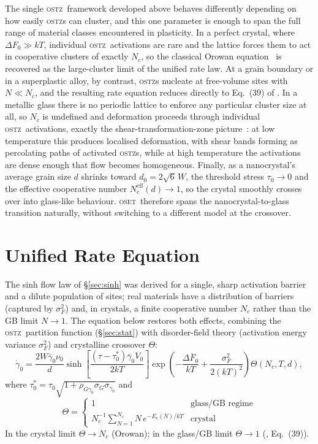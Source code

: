 \documentclass[3p]{elsarticle}
\newcommand{\OSTZ}{\textsc{ostz}}
\newcommand{\OSET}{\textsc{oset}}
\newcommand{\dF}{\Delta F_0}
\newcommand{\gz}{\gamma_0}
\begin{document}
The single \OSTZ\ framework developed above behaves differently
depending on how easily \OSTZ s can cluster, and this one parameter
is enough to span the full range of material classes encountered in
plasticity. In a perfect crystal, where $\dF\gg kT$, individual
\OSTZ\ activations are rare and the lattice forces them to act in
cooperative clusters of exactly $N_c$, so the classical Orowan
equation~\citep{orowan1940} is recovered as the large-cluster limit
of the unified rate law. At a grain boundary or in a superplastic alloy, by contrast,
\OSTZ s nucleate at free-volume sites with $N\ll N_c$, and the
resulting rate equation reduces directly to Eq.~(39) of
\citet{pad-part1}. In a metallic glass there is no
periodic lattice to enforce any particular cluster size at all, so
$N_c$ is undefined and deformation proceeds through individual
\OSTZ\ activations, exactly the shear-transformation-zone
picture~\citep{argon1979,falk-langer1998}: at low temperature this
produces localised deformation, with shear bands forming as
percolating paths of activated \OSTZ s, while at high temperature
the activations are dense enough that flow becomes homogeneous.
Finally, as a nanocrystal's average grain size $d$ shrinks toward
$d_0=2\sqrt6\,W$, the threshold stress $\tau_0\to0$ and the
effective cooperative number $N_c^\text{eff}(d)\to1$, so the
crystal smoothly crosses over into glass-like behaviour. \OSET\
therefore spans the nanocrystal-to-glass transition naturally,
without switching to a different model at the crossover.

\section{Unified Rate Equation}
\label{sec:unified}

The sinh flow law of \S\ref{sec:sinh} was derived for a single,
sharp activation barrier and a dilute population of sites; real
materials have a distribution of barriers (captured by $\sigma_F^2$)
and, in crystals, a finite cooperative number $N_c$ rather than the
GB limit $N\to1$. The equation below restores both effects,
combining the \OSTZ\ partition function (\S\ref{sec:stat}) with
disorder-field theory (activation energy variance $\sigma_F^2$)
and crystalline crossover $\Theta$:
\begin{equation}
  \dot\gz=\frac{2W\bar\gz\nu_0}{d}
  \sinh\!\left[\frac{(\tau-\tau_0^*)\bar\gz V_0}{2kT}\right]
  \exp\!\!\left(-\frac{\Delta\bar F_0}{kT}
  +\frac{\sigma_F^2}{2(kT)^2}\right)\Theta(N_c,T,d),
  \label{eq:rateUnified}
\end{equation}
where $\tau_0^*=\tau_0\sqrt{1+\rho_{G\gz}\sigma_G\sigma_{\gz}}$ and
\begin{equation}
  \Theta=\begin{cases}
    1 & \text{glass/GB regime}\\
    N_c^{-1}\!\sum_{N=1}^{N_c}\!N\,e^{-E_c(N)/kT} & \text{crystal}
  \end{cases}
  \label{eq:Theta}
\end{equation}
In the crystal limit $\Theta\to N_c$ (Orowan); in the glass/GB limit
$\Theta\to1$ (\citet{pad-part1}, Eq.~(39)).
\end{document}
